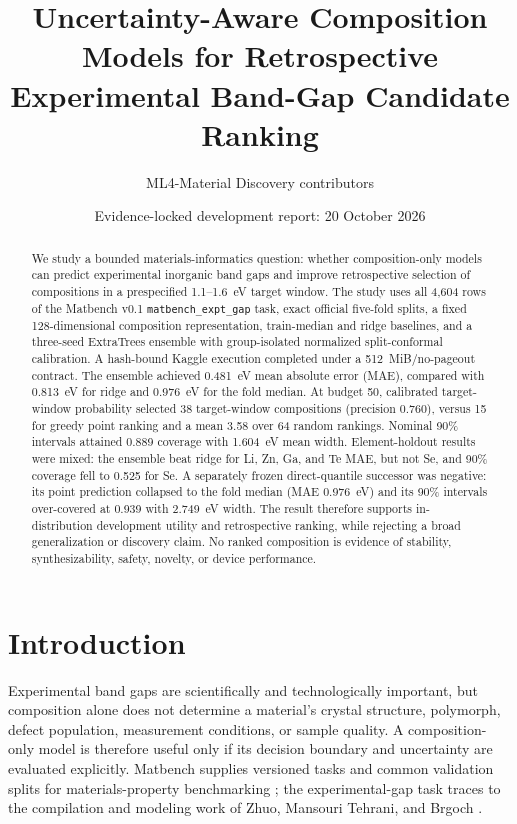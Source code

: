 \documentclass[11pt]{article}
\title{Uncertainty-Aware Composition Models for Retrospective Experimental Band-Gap Candidate Ranking}
\author{ML4-Material Discovery contributors}
\date{Evidence-locked development report: 20 October 2026}
\begin{document}
\maketitle

\begin{abstract}
We study a bounded materials-informatics question: whether composition-only models can predict experimental inorganic band gaps and improve retrospective selection of compositions in a prespecified 1.1--1.6~eV target window. The study uses all 4,604 rows of the Matbench v0.1 \texttt{matbench\_expt\_gap} task, exact official five-fold splits, a fixed 128-dimensional composition representation, train-median and ridge baselines, and a three-seed ExtraTrees ensemble with group-isolated normalized split-conformal calibration. A hash-bound Kaggle execution completed under a 512~MiB/no-pageout contract. The ensemble achieved 0.481~eV mean absolute error (MAE), compared with 0.813~eV for ridge and 0.976~eV for the fold median. At budget 50, calibrated target-window probability selected 38 target-window compositions (precision 0.760), versus 15 for greedy point ranking and a mean 3.58 over 64 random rankings. Nominal 90\% intervals attained 0.889 coverage with 1.604~eV mean width. Element-holdout results were mixed: the ensemble beat ridge for Li, Zn, Ga, and Te MAE, but not Se, and 90\% coverage fell to 0.525 for Se. A separately frozen direct-quantile successor was negative: its point prediction collapsed to the fold median (MAE 0.976~eV) and its 90\% intervals over-covered at 0.939 with 2.749~eV width. The result therefore supports in-distribution development utility and retrospective ranking, while rejecting a broad generalization or discovery claim. No ranked composition is evidence of stability, synthesizability, safety, novelty, or device performance.
\end{abstract}

\section{Introduction}
Experimental band gaps are scientifically and technologically important, but composition alone does not determine a material's crystal structure, polymorph, defect population, measurement conditions, or sample quality. A composition-only model is therefore useful only if its decision boundary and uncertainty are evaluated explicitly. Matbench supplies versioned tasks and common validation splits for materials-property benchmarking \cite{dunn2020matbench}; the experimental-gap task traces to the compilation and modeling work of Zhuo, Mansouri Tehrani, and Brgoch \cite{zhuo2018bandgaps}.
\end{document}

